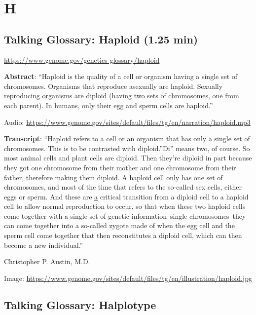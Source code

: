 \documentclass[
]{book}
\begin{document}
\hypertarget{h}{%
\chapter{H}\label{h}}

\hypertarget{talking-glossary-haploid-1.25-min}{%
\section{Talking Glossary: Haploid (1.25 min)}\label{talking-glossary-haploid-1.25-min}}

\url{https://www.genome.gov/genetics-glossary/haploid}

\textbf{Abstract}: ``Haploid is the quality of a cell or organism having a single set of chromosomes. Organisms that reproduce asexually are haploid. Sexually reproducing organisms are diploid (having two sets of chromosomes, one from each parent). In humans, only their egg and sperm cells are haploid.''

Audio: \url{https://www.genome.gov/sites/default/files/tg/en/narration/haploid.mp3}

\textbf{Transcript}: ``Haploid refers to a cell or an organism that has only a single set of chromosomes. This is to be contrasted with diploid.''Di'' means two, of course. So most animal cells and plant cells are diploid. Then they're diploid in part because they got one chromosome from their mother and one chromosome from their father, therefore making them diploid. A haploid cell only has one set of chromosomes, and most of the time that refers to the so-called sex cells, either eggs or sperm. And these are \protect\hyperlink{a}{a} critical transition from a diploid cell to a haploid cell to allow normal reproduction to occur, so that when these two haploid cells come together with a single set of genetic information--single chromosomes--they can come together into a so-called zygote made of when the egg cell and the sperm cell come together that then reconstitutes a diploid cell, which can then become a new individual.''

Christopher P. Austin, M.D.

Image: \url{https://www.genome.gov/sites/default/files/tg/en/illustration/haploid.jpg}

\hypertarget{talking-glossary-halplotype}{%
\section{Talking Glossary: Halplotype}\label{talking-glossary-halplotype}}
\end{document}
